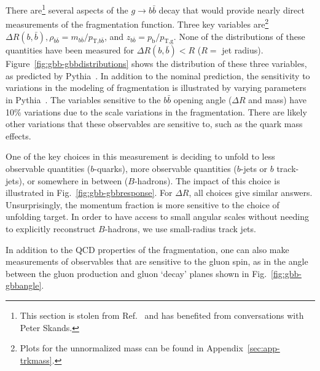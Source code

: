 There are\footnote{This section is stolen from Ref.~\cite{Ilten:2017rbd} and has benefited from conversations with Peter Skands.} several aspects of the $g\rightarrow b\bar{b}$ decay that would provide nearly direct measurements of the fragmentation function.  Three key variables are\footnote{Plots for the unnormalized mass can be found in Appendix~\ref{sec:app-trkmass}.} $\Delta R(b,\bar{b}), \rho_{b\bar{b}}=m_{b\bar{b}}/p_\text{T,$b\bar{b}$}$, and $z_{b\bar{b}}=p_\text{b}/p_\text{T,g}$.  None of the distributions of these quantities have been measured for $\Delta R(b,\bar{b}) < R$ ($R=$ jet radius).  Figure~\ref{fig:gbb-gbbdistributions} shows the distribution of these three variables, as predicted by Pythia~\cite{Pythia8}.  In addition to the nominal prediction, the sensitivity to variations in the modeling of fragmentation is illustrated by varying parameters in Pythia~\cite{pythiavariations}.  The variables sensitive to the $b\bar{b}$ opening angle ($\Delta R$ and mass) have 10\% variations due to the scale variations in the fragmentation.  There are likely other variations that these observables are sensitive to, such as the quark mass effects.

One of the key choices in this measurement is deciding to unfold to less observable quantities ($b$-quarks), more observable quantities ($b$-jets or $b$ track-jets), or somewhere in between ($B$-hadrons).  The impact of this choice is illustrated in Fig.~\ref{fig:gbb-gbbresponse}.  For $\Delta R$, all choices give similar answers.  Unsurprisingly, the momentum fraction is more sensitive to the choice of unfolding target.  In order to have access to small angular scales without needing to explicitly reconstruct $B$-hadrons, we use small-radius track jets.

In addition to the QCD properties of the fragmentation, one can also make measurements of observables that are sensitive to the gluon spin, as in the angle between the gluon production and gluon `decay' planes shown in Fig.~\ref{fig:gbb-gbbangle}.

